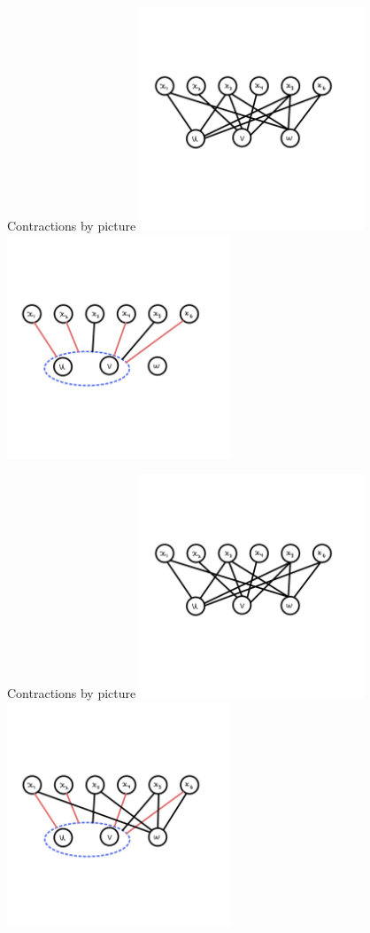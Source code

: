 \documentclass[aspectratio=169]{beamer}
\begin{document}
\begin{frame}{Contractions by picture}
    \includegraphics[width=0.5\textwidth]{images/cropped-01.jpg}%
    \includegraphics[width=0.5\textwidth]{images/cropped-05.jpg}
\end{frame}

\begin{frame}{Contractions by picture}
    \includegraphics[width=0.5\textwidth]{images/cropped-01.jpg}%
    \includegraphics[width=0.5\textwidth]{images/cropped-06.jpg}
\end{frame}
\end{document}
